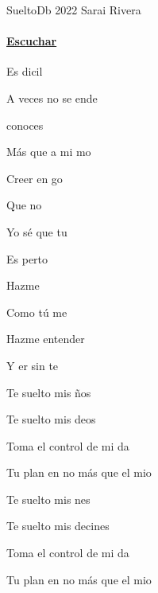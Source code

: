 \documentclass[12pt, spanish]{book}
\begin{document}
    \begin{song}{Suelto}{Db}
        {2022} %
        {Sarai Rivera}
        {} %
        {}
        \ifChordBk
        \paragraph{\mbox{}\hfill\protect\href{https://open.spotify.com/intl-es/track/4gzdXnYl4s10PXMZn1XSlF}{Escuchar}\mbox{}\hfill}
        \fi


        \begin{SBOpGroup}
            Es dicil

            A veces no se ende

             conoces

            Más que a mi mo

            Creer en go

            Que no 

            Yo sé que tu 

            Es perto
        \end{SBOpGroup}

        \begin{SBOpGroup}
            Hazme 

            Como tú me 

            Hazme entender

            Y er sin te
        \end{SBOpGroup}

        \begin{SBChorus}
            Te suelto mis ños

            Te suelto mis deos

            Toma el control de mi da

            Tu plan en  no más que el mio

            Te suelto mis nes

            Te suelto mis decines

            Toma el control de mi da

            Tu plan en  no más que el mio
        \end{SBChorus}


\end{song}
\end{document}
